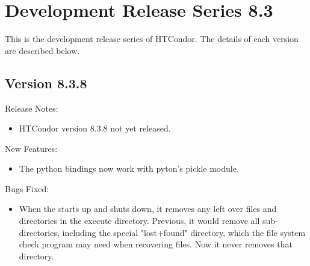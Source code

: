 
\section{\label{sec:History-8-3}Development Release Series 8.3}

This is the development release series of HTCondor.
The details of each version are described below.


\subsection*{\label{sec:New-8-3-8}Version 8.3.8}

\noindent Release Notes:

\begin{itemize}

\item HTCondor version 8.3.8 not yet released.

\end{itemize}


\noindent New Features:

\begin{itemize}

\item The python bindings now work with pyton's pickle module. 

\end{itemize}

\noindent Bugs Fixed:

\begin{itemize}

\item When the  starts up and shuts down, it removes any left over files and directories in the execute directory.  Previous, it would remove all sub-directories, including the special "lost+found" directory, which the file system check program may need when recovering files.  Now it never removes that directory.

\end{itemize}

